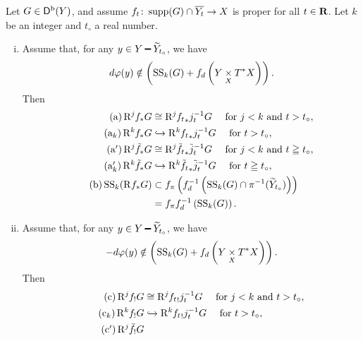 \begin{Proposition+}
  Let \(G\in\Dompb(Y)\), and assume \(
    f_{t}\colon \supp(G)\cap \overline{Y_t}\to X
  \) is proper for all \(t\in\rr\). 
  Let \(k\) be an integer and \(t_\circ\) a real number.
  \begin{enumerate}[(i)]
    \item Assume that, 
    for any \(y\in Y\smi \widetilde{Y}_{t_{\circ}}\), 
    we have \[
      d\varphi(y)\notin \left(
        \muS[k](G)+ \mdiff[f]\left(
          Y\pb[X]\cotb[X]
        \right)
      \right).
    \]
    Then \begin{align}
      \tag{a}
      \Rder[j]{f_{\ast}}G
      &\cong
      \Rder[j]{{f_{t}}_{\ast}}j^{-1}_{t}G
      \quad
      \text{ for \(j<k\) and \(t>t_\circ\)},\\
      \tag{a\(_k\)}
      \Rder[k]{f_{\ast}}G
      &\hookrightarrow
      \Rder[k]{{f_{t}}_{\ast}}j^{-1}_{t}G
      \quad
      \text{ for \(t>t_\circ\)},\\
      \tag{a\('\)}
      \Rder[j]{\tilde{f}_{\ast}}G
      &\cong
      \Rder[j]\tilde{f_{t}}_{\ast}\tilde{j}^{-1}_{t}G
      \quad
      \text{ for \(j<k\) and \(t\geqq t_\circ\)},\\
      \tag{a\(_k'\)}
      \Rder[k]{\tilde{f}_{\ast}}G
      &\hookrightarrow
      \Rder[k]\tilde{f_{t}}_{\ast}\tilde{j}^{-1}_{t}G
      \quad
      \text{ for \(t\geqq t_\circ\)},\\
      \tag{b}
      \muS[k](\Rder[]{f_{\ast}}G)
      &\subset
      \mpb[f]\left(\mdiff[f]^{-1}\left(
        \muS[k](G)\cap \pi^{-1}(\widetilde{Y}_{t_{\circ}})
      \right)\right)\\
      \notag&=\mpb[f]\mdiff[f]^{-1}\left(
        \muS[k](G)
      \right).
    \end{align}
    \item Assume that, 
    for any \(y\in Y\smi \widetilde{Y}_{t_{\circ}}\), 
    we have \[
      -d\varphi(y)\notin \left(
        \muS[k](G)+ \mdiff[f]\left(
          Y\pb[X]\cotb[X]
        \right)
      \right).
    \]
    Then \begin{align}
      \tag{c}
      \Rder[j]{f_{!}}G
      &\cong
      \Rder[j]{{f_{t}}_{!}}j^{-1}_{t}G
      \quad
      \text{ for \(j<k\) and \(t>t_\circ\)},\\
      \tag{c\(_k\)}
      \Rder[k]{f_{!}}G
      &\hookrightarrow
      \Rder[k]{{f_{t}}_{!}}j^{-1}_{t}G
      \quad
      \text{ for \(t>t_\circ\)},\\
      \tag{c\('\)}
      \Rder[j]{\tilde{f}_{!}}G

\end{align}
\end{enumerate}
\end{Proposition+}
